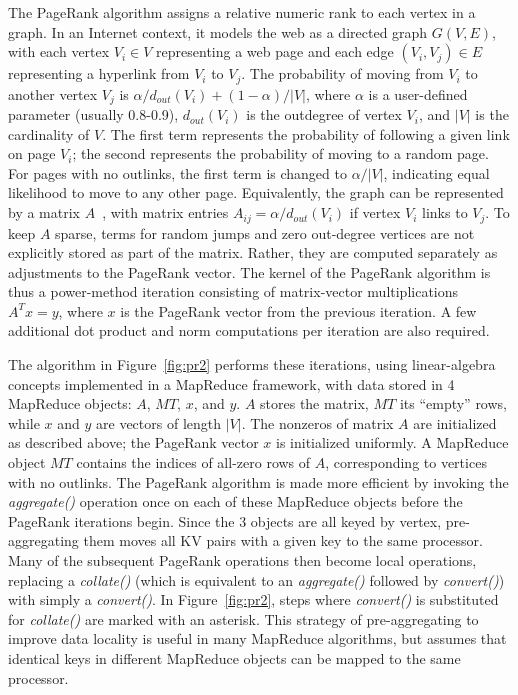 The PageRank algorithm assigns a relative numeric rank to each vertex
in a graph.  In an Internet context, it models the web as a directed
graph $G(V,E)$, with each vertex $V_i \in V$ representing a web page
and each edge $(V_i, V_j) \in E$ representing a hyperlink from $V_i$
to $V_j$.  The probability of moving from $V_i$ to another vertex
$V_j$ is $\alpha/d_{out}(V_i) + (1-\alpha)/|V|$, where $\alpha$ is a
user-defined parameter (usually 0.8-0.9), $d_{out}(V_i)$ is the
outdegree of vertex $V_i$, and $|V|$ is the cardinality of $V$.  The
first term represents the probability of following a given link on
page $V_i$; the second represents the probability of moving to a
random page.  For pages with no outlinks, the first term is changed to
$\alpha/|V|$, indicating equal likelihood to move to any other page.
Equivalently, the graph can be represented by a matrix
$A$~\cite{LangvilleMeyer05a}, with matrix entries $A_{ij} =
\alpha/d_{out}(V_i)$ if vertex $V_i$ links to $V_j$.  To keep $A$
sparse, terms for random jumps and zero out-degree vertices are not
explicitly stored as part of the matrix.  Rather, they are computed
separately as adjustments to the PageRank vector.  The kernel of the
PageRank algorithm is thus a power-method iteration consisting of
matrix-vector multiplications $A^T x=y$, where $x$ is the PageRank
vector from the previous iteration.  A few additional dot product and
norm computations per iteration are also required.

The algorithm in Figure~\ref{fig:pr2} performs these iterations, using
linear-algebra concepts implemented in a MapReduce framework, with
data stored in 4 MapReduce objects: $A$, $MT$, $x$, and $y$.  $A$
stores the matrix, $MT$ its ``empty'' rows, while $x$ and $y$ are
vectors of length $|V|$.  The nonzeros of matrix $A$ are initialized
as described above; the PageRank vector $x$ is initialized uniformly.
A MapReduce object $MT$ contains the indices of all-zero rows of $A$,
corresponding to vertices with no outlinks.  The PageRank algorithm is
made more efficient by invoking the {\it aggregate()} operation once
on each of these MapReduce objects before the PageRank iterations
begin.  Since the 3 objects are all keyed by vertex, pre-aggregating
them moves all KV pairs with a given key to the same processor.  Many
of the subsequent PageRank operations then become local operations,
replacing a {\it collate()} (which is equivalent to an {\it
aggregate()} followed by {\it convert()}) with simply a {\it
convert()}.  In Figure~\ref{fig:pr2}, steps where {\it convert()} is
substituted for {\it collate()} are marked with an asterisk.  This
strategy of pre-aggregating to improve data locality is useful in many
MapReduce algorithms, but assumes that identical keys in different
MapReduce objects can be mapped to the same processor.

